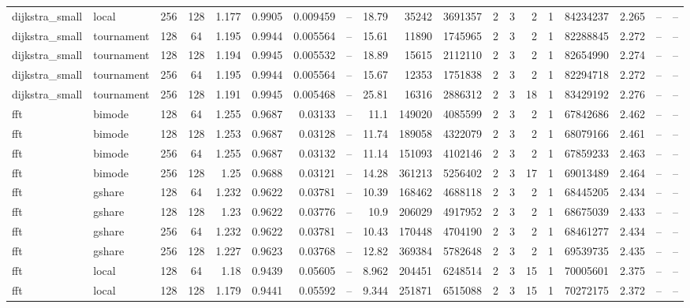 \begin{table}[ht]
\begin{tabular}{l l c c r r r r r r r r r r r r r r r}
dijkstra_small & local & 256 & 128 & 1.177 & 0.9905 & 0.009459 & -- & 18.79 & 35242 & 3691357 & 2 & 3 & 2 & 1 & 84234237 & 2.265 & -- & -- \\
dijkstra_small & tournament & 128 & 64 & 1.195 & 0.9944 & 0.005564 & -- & 15.61 & 11890 & 1745965 & 2 & 3 & 2 & 1 & 82288845 & 2.272 & -- & -- \\
dijkstra_small & tournament & 128 & 128 & 1.194 & 0.9945 & 0.005532 & -- & 18.89 & 15615 & 2112110 & 2 & 3 & 2 & 1 & 82654990 & 2.274 & -- & -- \\
dijkstra_small & tournament & 256 & 64 & 1.195 & 0.9944 & 0.005564 & -- & 15.67 & 12353 & 1751838 & 2 & 3 & 2 & 1 & 82294718 & 2.272 & -- & -- \\
dijkstra_small & tournament & 256 & 128 & 1.191 & 0.9945 & 0.005468 & -- & 25.81 & 16316 & 2886312 & 2 & 3 & 18 & 1 & 83429192 & 2.276 & -- & -- \\
fft & bimode & 128 & 64 & 1.255 & 0.9687 & 0.03133 & -- & 11.1 & 149020 & 4085599 & 2 & 3 & 2 & 1 & 67842686 & 2.462 & -- & -- \\
fft & bimode & 128 & 128 & 1.253 & 0.9687 & 0.03128 & -- & 11.74 & 189058 & 4322079 & 2 & 3 & 2 & 1 & 68079166 & 2.461 & -- & -- \\
fft & bimode & 256 & 64 & 1.255 & 0.9687 & 0.03132 & -- & 11.14 & 151093 & 4102146 & 2 & 3 & 2 & 1 & 67859233 & 2.463 & -- & -- \\
fft & bimode & 256 & 128 & 1.25 & 0.9688 & 0.03121 & -- & 14.28 & 361213 & 5256402 & 2 & 3 & 17 & 1 & 69013489 & 2.464 & -- & -- \\
fft & gshare & 128 & 64 & 1.232 & 0.9622 & 0.03781 & -- & 10.39 & 168462 & 4688118 & 2 & 3 & 2 & 1 & 68445205 & 2.434 & -- & -- \\
fft & gshare & 128 & 128 & 1.23 & 0.9622 & 0.03776 & -- & 10.9 & 206029 & 4917952 & 2 & 3 & 2 & 1 & 68675039 & 2.433 & -- & -- \\
fft & gshare & 256 & 64 & 1.232 & 0.9622 & 0.03781 & -- & 10.43 & 170448 & 4704190 & 2 & 3 & 2 & 1 & 68461277 & 2.434 & -- & -- \\
fft & gshare & 256 & 128 & 1.227 & 0.9623 & 0.03768 & -- & 12.82 & 369384 & 5782648 & 2 & 3 & 2 & 1 & 69539735 & 2.435 & -- & -- \\
fft & local & 128 & 64 & 1.18 & 0.9439 & 0.05605 & -- & 8.962 & 204451 & 6248514 & 2 & 3 & 15 & 1 & 70005601 & 2.375 & -- & -- \\
fft & local & 128 & 128 & 1.179 & 0.9441 & 0.05592 & -- & 9.344 & 251871 & 6515088 & 2 & 3 & 15 & 1 & 70272175 & 2.372 & -- & -- \\

\end{tabular}
\end{table}
